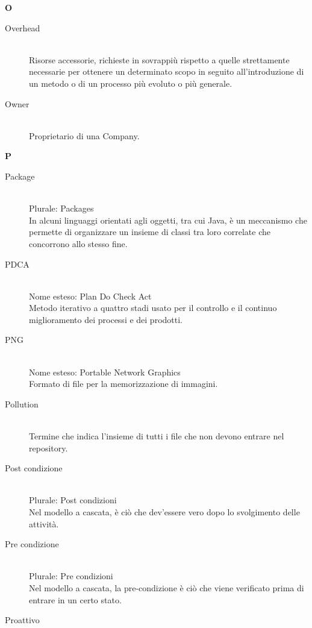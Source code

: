 \newpage 
\begin{center}\textbf{\Huge{O}}\end{center}
\begin{description}\item[Overhead] \hfill \\
Risorse accessorie, richieste in sovrappiù rispetto a quelle strettamente necessarie per ottenere un determinato scopo in seguito all'introduzione di un metodo o di un processo più evoluto o più generale.
 \item[Owner] \hfill \\
Proprietario di una Company.
 \end{description}
\newpage 
\begin{center}\textbf{\Huge{P}}\end{center}
\begin{description}\item[Package] \hfill \\
Plurale: Packages\\ 
In alcuni linguaggi orientati agli oggetti, tra cui Java, è un meccanismo che permette di organizzare un insieme di classi tra loro correlate che concorrono allo stesso fine.
 \item[PDCA] \hfill \\
Nome esteso: Plan Do Check Act\\ 
Metodo iterativo a quattro stadi usato per il controllo e il continuo miglioramento dei processi e dei prodotti.
 \item[PNG] \hfill \\
Nome esteso: Portable Network Graphics\\ 
Formato di file per la memorizzazione di immagini.
 \item[Pollution] \hfill \\
Termine che indica l'insieme di tutti i file che non devono entrare nel repository.
 \item[Post condizione] \hfill \\
Plurale: Post condizioni\\ 
Nel modello a cascata, è ciò che dev'essere vero dopo lo svolgimento delle attività.
 \item[Pre condizione] \hfill \\
Plurale: Pre condizioni\\ 
Nel modello a cascata, la pre-condizione è ciò che viene verificato prima di entrare in un certo stato.
 \item[Proattivo] \hfill \\

\end{description}
